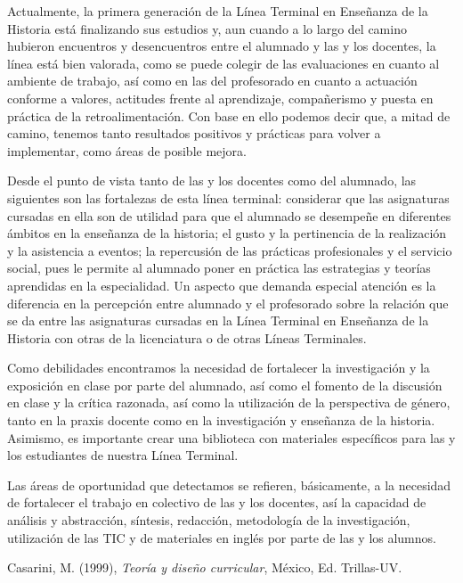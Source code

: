Actualmente, la primera generación de la Línea Terminal en Enseñanza de la Historia está finalizando sus estudios y, aun cuando a lo largo del camino hubieron encuentros y 
desencuentros entre el alumnado y las y los docentes, la línea está bien valorada, como se puede
colegir de las evaluaciones en cuanto al ambiente de trabajo, así como en las del 
profesorado en cuanto a actuación conforme a valores, actitudes frente al aprendizaje, compañerismo y puesta en práctica de la retroalimentación. Con
base en ello podemos decir que, a mitad de camino, tenemos tanto resultados positivos 
y prácticas para volver a implementar,  como áreas de posible mejora. 

Desde el punto de vista tanto de las y los docentes como del alumnado, las siguientes son las fortalezas de esta línea terminal: considerar que las asignaturas cursadas 
en ella son de utilidad para que el alumnado se desempeñe 
en diferentes ámbitos en la enseñanza de la historia; el gusto y la
pertinencia de la realización y la asistencia a eventos; la repercusión de las 
prácticas profesionales y el servicio social, pues le permite al alumnado poner en 
práctica las estrategias y teorías aprendidas en la especialidad. Un 
aspecto  que demanda especial atención es la diferencia en la percepción entre 
alumnado y el profesorado sobre la relación que se da entre las asignaturas cursadas 
en la Línea Terminal en Enseñanza de la Historia con otras de la licenciatura 
o de otras Líneas Terminales. 

\enlargethispage{1\baselineskip}
Como debilidades encontramos la necesidad de fortalecer la investigación y la exposición en clase por parte del alumnado,
así como el fomento de la discusión en clase y la crítica razonada, así como la utilización de la perspectiva de
género, tanto en la praxis docente como en la investigación y enseñanza de la historia. Asimismo, es importante crear
una biblioteca con materiales específicos para las y los estudiantes de nuestra Línea Terminal.

Las áreas de oportunidad que detectamos se refieren, básicamente, a la necesidad de fortalecer el trabajo en colectivo de las y los docentes, así la capacidad de análisis y abstracción, síntesis, redacción, metodología de la investigación, utilización de las TIC y de materiales en inglés por parte de las y los alumnos. 

\bigskip
{}
\enlargethispage{1\baselineskip}

\medskip
Casarini, M\@. (1999), \textit{Teoría y diseño curricular}, México, Ed\@. Trillas-UV\@. 


